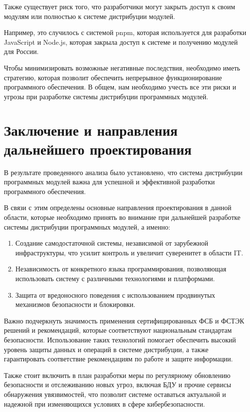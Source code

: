 Также существует риск того, что разработчики могут закрыть доступ к своим модулям или полностью к системе дистрибуции модулей.

Например, это случилось с системой pnpm, которая используется для разработки JavaScript и Node.js, которая закрыла доступ к системе и получению модулей для России. \cite{risk:pnpm_block_1} \cite{risk:pnpm_block_2}

Чтобы минимизировать возможные негативные последствия, необходимо иметь стратегию, которая позволит обеспечить непрерывное функционирование программного обеспечения. В общем, нам необходимо учесть все эти риски и угрозы при разработке системы дистрибуции программных модулей. 

\section{Заключение и направления дальнейшего проектирования}

В результате проведенного анализа было установлено, что система дистрибуции программных модулей важна для успешной и эффективной разработки программного обеспечения. 

В связи с этим определены основные направления проектирования в данной области, которые необходимо принять во внимание при дальнейшей разработке системы дистрибуции программных модулей, а именно:

\begin{enumerate}
\item Создание самодостаточной системы, независимой от зарубежной инфраструктуры, что усилит контроль и увеличит суверенитет в области IT.
\item Независимость от конкретного языка программирования, позволяющая использовать систему с различными технологиями и платформами.
\item Защита от вредоносного поведения с использованием продвинутых механизмов безопасности и блокировки.
\end{enumerate}

Важно подчеркнуть значимость применения сертифицированных ФСБ и ФСТЭК решений и рекомендаций, которые соответствуют национальным стандартам безопасности. Использование таких технологий помогает обеспечить высокий уровень защиты данных и операций в системе дистрибуции, а также гарантировать соответствие рекомендациям по работе и защите информации.

Также стоит включить в план разработки меры по регулярному обновлению безопасности и отслеживанию новых угроз, включая БДУ и прочие сервисы обнаружения увязвимостей, что позволит системе оставаться актуальной и надежной при изменяющихся условиях в сфере кибербезопасности.

